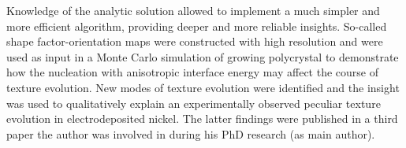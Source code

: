 Knowledge of the analytic solution allowed to implement a much simpler and more efficient algorithm, providing deeper and more reliable insights. So-called shape factor-orientation maps were constructed with high resolution and were used as input in a Monte Carlo simulation of growing polycrystal to demonstrate how the nucleation with anisotropic interface energy may affect the course of texture evolution. New modes of texture evolution were identified and the insight was used to qualitatively explain an experimentally observed peculiar texture evolution in electrodeposited nickel. The latter findings were published in a third paper the author was involved in during his PhD research (as main author).

%
%








